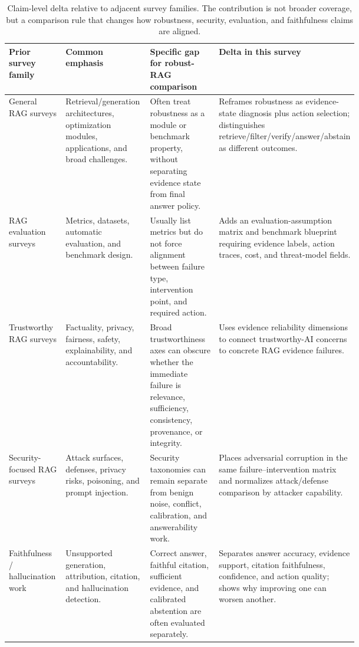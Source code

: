 \begin{table}[t]
\centering
\scriptsize
\renewcommand{\arraystretch}{0.92}
\begin{tabularx}{\linewidth}{>{\raggedright\arraybackslash}p{0.18\linewidth}>{\raggedright\arraybackslash}p{0.26\linewidth}>{\raggedright\arraybackslash}p{0.25\linewidth}X}
\toprule
\textbf{Prior survey family} & \textbf{Common emphasis} & \textbf{Specific gap for robust-RAG comparison} & \textbf{Delta in this survey} \\
\midrule
General RAG surveys & Retrieval/generation architectures, optimization modules, applications, and broad challenges. & Often treat robustness as a module or benchmark property, without separating evidence state from final answer policy. & Reframes robustness as evidence-state diagnosis plus action selection; distinguishes retrieve/filter/verify/answer/abstain as different outcomes. \\
RAG evaluation surveys & Metrics, datasets, automatic evaluation, and benchmark design. & Usually list metrics but do not force alignment between failure type, intervention point, and required action. & Adds an evaluation-assumption matrix and benchmark blueprint requiring evidence labels, action traces, cost, and threat-model fields. \\
Trustworthy RAG surveys & Factuality, privacy, fairness, safety, explainability, and accountability. & Broad trustworthiness axes can obscure whether the immediate failure is relevance, sufficiency, consistency, provenance, or integrity. & Uses evidence reliability dimensions to connect trustworthy-AI concerns to concrete RAG evidence failures. \\
Security-focused RAG surveys & Attack surfaces, defenses, privacy risks, poisoning, and prompt injection. & Security taxonomies can remain separate from benign noise, conflict, calibration, and answerability work. & Places adversarial corruption in the same failure--intervention matrix and normalizes attack/defense comparison by attacker capability. \\
Faithfulness / hallucination work & Unsupported generation, attribution, citation, and hallucination detection. & Correct answer, faithful citation, sufficient evidence, and calibrated abstention are often evaluated separately. & Separates answer accuracy, evidence support, citation faithfulness, confidence, and action quality; shows why improving one can worsen another. \\
\bottomrule
\end{tabularx}
\caption{Claim-level delta relative to adjacent survey families. The contribution is not broader coverage, but a comparison rule that changes how robustness, security, evaluation, and faithfulness claims are aligned.}
\label{tab:survey-delta}
\end{table}

